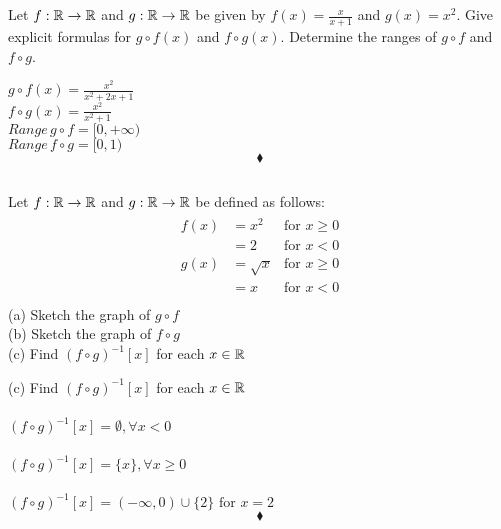 \subsection{}
\begin{tcolorbox}
Let $f:\mathbb{R}\rightarrow\mathbb{R}$ and $g:\mathbb{R}\rightarrow\mathbb{R}$ be given by $f(x)= \frac{x}{x+1}$ and $g(x)=x^2$. Give explicit formulas for $g\circ f(x)$ and $f\circ g(x)$. Determine the ranges of $g\circ f$ and $f\circ g$.
\end{tcolorbox}
$$ $$
$g\circ f(x)= \frac{x^2}{x^2+2x+1}$\\
$f\circ g(x)= \frac{x^2}{x^2+1}$\\
$Range \,g\circ f= [0,+\infty)$\\
$Range \,f\circ g=[0,1)$
$$\blacklozenge$$

\subsection{}
\begin{tcolorbox}
Let $f:\mathbb{R}\rightarrow\mathbb{R}$ and $g:\mathbb{R}\rightarrow\mathbb{R}$ be defined as follows:
\begin{align*}
\begin{array}{lll}
f(x)&=x^2&\text{for } x\ge 0\\
&=2&\text{for } x< 0\\
g(x)&=\sqrt{x}&\text{for } x\ge 0\\
&=x&\text{for } x<0\\
\end{array}
\end{align*}
(a) Sketch the graph of $g\circ f$\\
(b) Sketch the graph of $f\circ g$\\
(c) Find $\left( f\circ g\right)^{-1}[x]$ for each $x\in \mathbb{R}$\\

\end{tcolorbox}
\begin{figure}[H]%
    \centering
  \subfloat[$g\circ f$]{}\quad
    \subfloat[$f\circ g$]{}
\label{fig:fig_p3}
\end{figure}
(c) Find $\left( f\circ g\right)^{-1}[x]$ for each $x\in \mathbb{R}$\\\\
$\left( f\circ g\right)^{-1}[x]=\emptyset, \forall x< 0$\\\\
$\left( f\circ g\right)^{-1}[x]=\{x\}, \forall x\ge 0$\\\\
$\left( f\circ g\right)^{-1}[x]=(-\infty,0)\cup \{{2}\} \text{ for } x= {2}$
$$\blacklozenge$$


